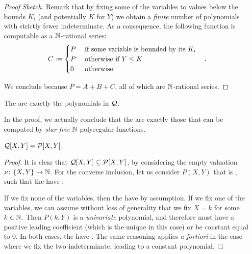 \documentclass[a4paper,11pt]{article}
\begin{document}
\begin{proof}[Proof Sketch]
    Remark that by fixing some of the variables
    to values 
    below the bounds $K_i$ (and potentially $K$ for $Y$)
    we obtain a \emph{finite} number of polynomials with strictly fewer
    indeterminate.
    As a consequence, the following function is computable
    as a $\mathbb{N}$-rational series:
    \begin{equation*}
        C \mathrel{:=}
        \begin{cases}
            P & \text{ if some variable is bounded by its } K_i \\
            P & \text{ otherwise if } Y \leq K \\
            0 & \text{ otherwise }
        \end{cases}
        \quad .
    \end{equation*}

    We conclude because
    $P = A + B + C$, all of which are $\mathbb{N}$-rational series.
\end{proof}

\begin{theorem}
    \label{corrected-version:thm}
    The  are exactly
    the polynomials in $\mathcal{Q}$.
\end{theorem}

\begin{theorem}
    \label{nsf-polynomials:thm}
    In the proof, we actually conclude that
    the 
    are exactly those that can be computed 
    by 
    \emph{star-free} $\mathbb{N}$-polyregular functions.
\end{theorem}

\begin{lemma}
    \label{lem:correct-covered-2}
    $\mathcal{Q}[X,Y] = \mathcal{P}[X,Y]$.
\end{lemma}
\begin{proof}
    It is clear that $\mathcal{Q}[X,Y] \subseteq \mathcal{P}[X,Y]$,
    by considering the empty valuation $\nu \colon \mathopen{\{} X,Y \mathclose{\}} \to \mathbb{N}$.
    For the converse inclusion, let us consider $P(X,Y)$
    that is , such that the 
    have .
   

    If we fix none of the variables, then the 
    have  by assumption. If we fix one of the
    variables, we can assume without loss of generality that we 
    fix $X = k$ for some $k \in \mathbb{N}$.
    Then $P(k,Y)$ is a  \emph{univariate} polynomial, 
    and therefore must have a positive leading coefficient
    (which is the unique  in this case)
    or be constant equal to 0. In both cases, the 
    have .
    The same reasoning applies \emph{a fortiori} in the case where
    we fix the two indeterminate, leading to a constant polynomial.
\end{proof}
\end{document}
